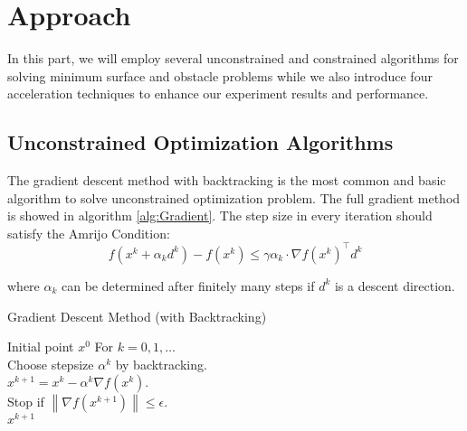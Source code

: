 \section{Approach}
In this part, we will employ several unconstrained and constrained algorithms for solving minimum surface and obstacle problems while we also introduce four acceleration techniques to enhance our experiment results and performance.

\subsection{Unconstrained Optimization Algorithms}
The gradient descent method with backtracking is the most common and basic algorithm to solve unconstrained optimization problem. The full gradient method is showed in algorithm \ref{alg:Gradient}. The step size in every iteration should satisfy the Amrijo Condition:
\begin{equation}
  f\left(x^{k}+\alpha_{k} d^{k}\right)-f\left(x^{k}\right) \leq \gamma \alpha_{k} \cdot \nabla f\left(x^{k}\right)^{\top} d^{k} 
\end{equation}

where $\alpha_{k}$ can be determined after finitely many steps if $d^{k}$ is a descent direction.
\begin{algorithm}[H]
  \caption{Gradient Descent Method (with Backtracking)}
  \label{alg:Gradient}
  \begin{algorithmic}[1]
  \REQUIRE
  Initial point $x^{0}$
  \STATE For $k=0,1, \ldots$ \\
  \STATE Choose stepsize $\alpha^{k}$ by backtracking. \\
  \STATE $x^{k+1}=x^{k}-\alpha^{k} \nabla f\left(x^{k}\right)$. \\
  \STATE Stop if $\left\|\nabla f\left(x^{k+1}\right)\right\| \leq \epsilon$. \\     
  \ENSURE $x^{k+1}$ 
 \end{algorithmic}
 \end{algorithm} 
 
